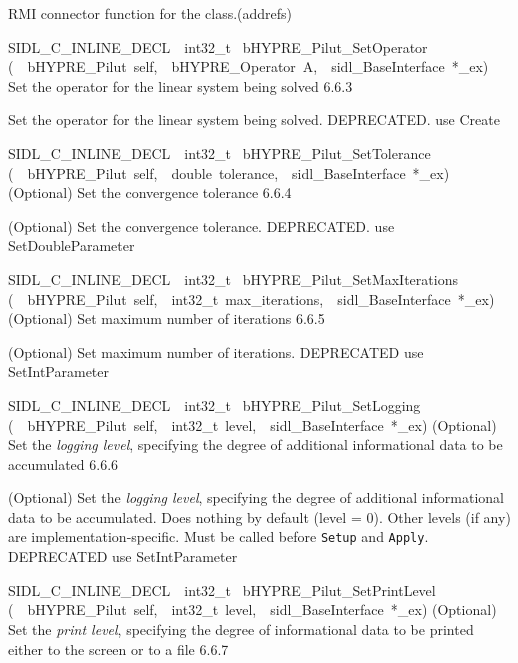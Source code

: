 \documentclass{article}
\begin{document}
\begin{cxxentry}
\begin{cxxentry}
\begin{cxxfunction}
\begin{cxxdoc}
RMI connector function for the class.(addrefs)
\end{cxxdoc}
\end{cxxfunction}
\begin{cxxfunction}
{SIDL\_C\_INLINE\_DECL\ \ int32\_t\ }
        {bHYPRE\_Pilut\_SetOperator}
        {(\ \ bHYPRE\_Pilut\ self,\ \ bHYPRE\_Operator\ A,\ \ sidl\_BaseInterface\ *\_ex)}
        {
Set the operator for the linear system being solved}
        {6.6.3}
\begin{cxxdoc}

Set the operator for the linear system being solved.
DEPRECATED.  use Create
\end{cxxdoc}
\end{cxxfunction}
\begin{cxxfunction}
{SIDL\_C\_INLINE\_DECL\ \ int32\_t\ }
        {bHYPRE\_Pilut\_SetTolerance}
        {(\ \ bHYPRE\_Pilut\ self,\ \ double\ tolerance,\ \ sidl\_BaseInterface\ *\_ex)}
        {
(Optional) Set the convergence tolerance}
        {6.6.4}
\begin{cxxdoc}

(Optional) Set the convergence tolerance.
DEPRECATED.  use SetDoubleParameter
\end{cxxdoc}
\end{cxxfunction}
\begin{cxxfunction}
{SIDL\_C\_INLINE\_DECL\ \ int32\_t\ }
        {bHYPRE\_Pilut\_SetMaxIterations}
        {(\ \ bHYPRE\_Pilut\ self,\ \ int32\_t\ max\_iterations,\ \ sidl\_BaseInterface\ *\_ex)}
        {
(Optional) Set maximum number of iterations}
        {6.6.5}
\begin{cxxdoc}

(Optional) Set maximum number of iterations.
DEPRECATED   use SetIntParameter
\end{cxxdoc}
\end{cxxfunction}
\begin{cxxfunction}
{SIDL\_C\_INLINE\_DECL\ \ int32\_t\ }
        {bHYPRE\_Pilut\_SetLogging}
        {(\ \ bHYPRE\_Pilut\ self,\ \ int32\_t\ level,\ \ sidl\_BaseInterface\ *\_ex)}
        {
(Optional) Set the {\it logging level}, specifying the degree
of additional informational data to be accumulated}
        {6.6.6}
\begin{cxxdoc}

(Optional) Set the {\it logging level}, specifying the degree
of additional informational data to be accumulated.  Does
nothing by default (level = 0).  Other levels (if any) are
implementation-specific.  Must be called before {\tt Setup}
and {\tt Apply}.
DEPRECATED   use SetIntParameter
\end{cxxdoc}
\end{cxxfunction}
\begin{cxxfunction}
{SIDL\_C\_INLINE\_DECL\ \ int32\_t\ }
        {bHYPRE\_Pilut\_SetPrintLevel}
        {(\ \ bHYPRE\_Pilut\ self,\ \ int32\_t\ level,\ \ sidl\_BaseInterface\ *\_ex)}
        {
(Optional) Set the {\it print level}, specifying the degree
of informational data to be printed either to the screen or
to a file}
        {6.6.7}
\begin{cxxdoc}


\end{cxxdoc}
\end{cxxfunction}
\end{cxxentry}
\end{cxxentry}
\end{document}
